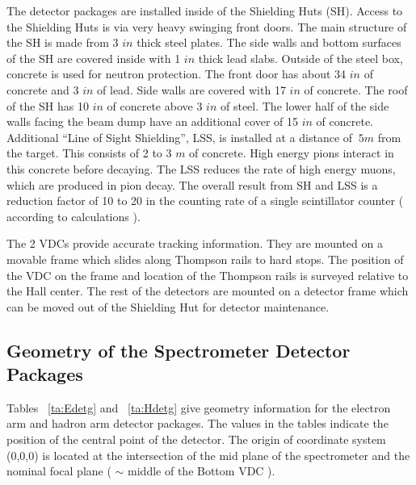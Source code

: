 The detector packages are installed inside of the Shielding Huts (SH). Access to the Shielding Huts 
is via very heavy swinging front doors. The main structure of the
SH is made from 3 $in$ thick steel plates.
The side walls and bottom surfaces of the SH are covered inside
with 1 $in$ thick lead slabs. Outside of the steel box, concrete
is used for neutron protection. 
The front door has about 34 $in$ of concrete and 3 $in$ of lead. Side walls are 
covered with 17 $in$ of concrete. The roof of the SH has 10 $in$ of concrete above 
3 $in$ of steel. The lower half of the side walls facing the beam dump have an
additional cover of 15 $in$ of concrete. Additional ``Line of Sight 
Shielding'', LSS, is installed at a distance of $~5 m$ from the
target. This consists of 2 to 3 $m$ of concrete. 
High energy pions interact in this concrete before decaying. The
LSS reduces the rate of 
high energy muons, which are produced in pion decay. The overall
result from SH and LSS is a reduction 
factor of 10 to 20 in the counting rate of a single scintillator counter
( according to calculations ). 

The 2 VDCs provide accurate tracking information. They are
mounted on a movable frame which slides 
along Thompson rails to hard stops. 
The position of the VDC on the frame and location of the 
Thompson rails is surveyed relative to the Hall center. The
rest of the detectors are mounted 
on a detector frame which can be moved out of the Shielding Hut
for detector maintenance.   

\subsection{Geometry of the Spectrometer Detector Packages}

Tables ~\ref{ta:Edetg} and ~\ref{ta:Hdetg} give geometry
information for the electron arm and hadron arm detector packages. 
The values in the tables
indicate the position of the central point of the detector.
The origin of coordinate system (0,0,0) is located at the intersection of 
the mid plane of the spectrometer and the nominal focal
plane ( $\sim$ middle of the Bottom VDC ).

